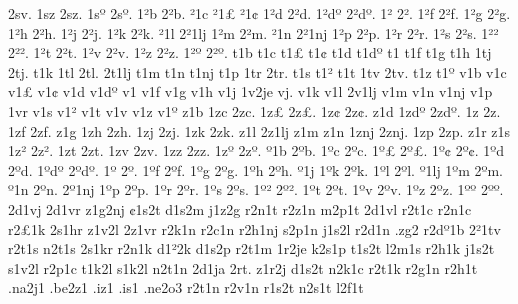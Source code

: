{2sv.
1sz
2sz.
1s^^ba
2s^^ba.
1^^b2b
2^^b2b.
^^b21c
^^b21^^a3
^^b21^^a2
1^^b2d
2^^b2d.
1^^b2d^^ba
2^^b2d^^ba.
1^^b2^^9e
2^^b2^^9e.
1^^b2f
2^^b2f.
1^^b2g
2^^b2g.
1^^b2h
2^^b2h.
1^^b2j
2^^b2j.
1^^b2k
2^^b2k.
^^b21l
2^^b21lj
1^^b2m
2^^b2m.
^^b21n
2^^b21nj
1^^b2p
2^^b2p.
1^^b2r
2^^b2r.
1^^b2s
2^^b2s.
1^^b2^^b2
2^^b2^^b2.
1^^b2t
2^^b2t.
1^^b2v
2^^b2v.
1^^b2z
2^^b2z.
1^^b2^^ba
2^^b2^^ba.
t1b
t1c
t1^^a3
t1^^a2
t1d
t1d^^ba
t1^^9e
t1f
t1g
t1h
1tj
2tj.
t1k
1tl
2tl.
2t1lj
t1m
t1n
t1nj
t1p
1tr
2tr.
t1s
t1^^b2
t1t
1tv
2tv.
t1z
t1^^ba
v1b
v1c
v1^^a3
v1^^a2
v1d
v1d^^ba
v1^^9e
v1f
v1g
v1h
v1j
1v2je
vj.
v1k
v1l
2v1lj
v1m
v1n
v1nj
v1p
1vr
v1s
v1^^b2
v1t
v1v
v1z
v1^^ba
z1b
1zc
2zc.
1z^^a3
2z^^a3.
1z^^a2
2z^^a2.
z1d
1zd^^ba
2zd^^ba.
1z^^9e
2z^^9e.
1zf
2zf.
z1g
1zh
2zh.
1zj
2zj.
1zk
2zk.
z1l
2z1lj
z1m
z1n
1znj
2znj.
1zp
2zp.
z1r
z1s
1z^^b2
2z^^b2.
1zt
2zt.
1zv
2zv.
1zz
2zz.
1z^^ba
2z^^ba.
^^ba1b
2^^bab.
1^^bac
2^^bac.
1^^ba^^a3
2^^ba^^a3.
1^^ba^^a2
2^^ba^^a2.
1^^bad
2^^bad.
1^^bad^^ba
2^^bad^^ba.
1^^ba^^9e
2^^ba^^9e.
1^^baf
2^^baf.
1^^bag
2^^bag.
1^^bah
2^^bah.
^^ba1j
1^^bak
2^^bak.
1^^bal
2^^bal.
^^ba1lj
1^^bam
2^^bam.
^^ba1n
2^^ban.
2^^ba1nj
1^^bap
2^^bap.
1^^bar
2^^bar.
1^^bas
2^^bas.
1^^ba^^b2
2^^ba^^b2.
1^^bat
2^^bat.
1^^bav
2^^bav.
1^^baz
2^^baz.
1^^ba^^ba
2^^ba^^ba.
%
2d1vj
2d1vr
z1g2nj
^^a21s2t
d1s2m
j1z2g
r2n1t
r2z1n
m2p1t
2d1vl
r2t1c
r2n1c
r2^^a31k
2s1hr
z1v2l
2z1vr
r2k1n
r2c1n
r2h1nj
s2p1n
j1s2l
r2d1n
.zg2
r2d^^ba1b
2^^b21tv
r2t1s
n2t1s
2s1kr
r2n1k
d1^^b22k
d1s2p
r2t1m
1r2je
k2s1p
t1s2t
l2m1s
r2h1k
j1s2t
s1v2l
r2p1c
t1k2l
s1k2l
n2t1n
2d1ja
2rt.
z1r2j
d1s2t
n2k1c
r2t1k
r2g1n
r2h1t
.na2j1
.be2z1
.iz1
.is1
.ne2o3
r2t1n
r2v1n
r1s2t
n2s1t
l2f1t
}
